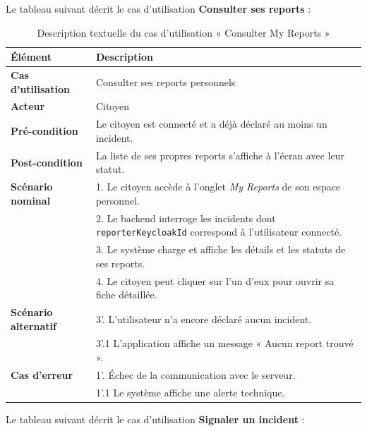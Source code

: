 Le tableau suivant décrit le cas d'utilisation \textbf{\og Consulter ses reports \fg{}} :

\begin{table}[H]
    \centering
    \caption{Description textuelle du cas d'utilisation « Consulter My Reports »}
    \label{tab:txt_favs}
    \vspace{0.2cm}
    \small
    \begin{tabularx}{\textwidth}{|l|X|}
        \hline
        \textbf{Élément} & \textbf{Description} \\ \hline
        \textbf{Cas d’utilisation} & Consulter ses reports personnels \\ \hline
        \textbf{Acteur} & Citoyen \\ \hline
        \textbf{Pré-condition} & Le citoyen est connecté et a déjà déclaré au moins un incident. \\ \hline
        \textbf{Post-condition} & La liste de ses propres reports s'affiche à l'écran avec leur statut. \\ \hline
        \textbf{Scénario nominal} &
        1. Le citoyen accède à l'onglet \textit{My Reports} de son espace personnel.\\
        & 2. Le backend interroge les incidents dont \texttt{reporterKeycloakId} correspond à l'utilisateur connecté.\\
        & 3. Le système charge et affiche les détails et les statuts de ses reports.\\
        & 4. Le citoyen peut cliquer sur l'un d'eux pour ouvrir sa fiche détaillée. \\ \hline
        \textbf{Scénario alternatif} &
        3'. L'utilisateur n'a encore déclaré aucun incident.\\
        & 3'.1 L'application affiche un message « Aucun report trouvé ». \\ \hline
        \textbf{Cas d’erreur} &
        1'. Échec de la communication avec le serveur.\\
        & 1'.1 Le système affiche une alerte technique. \\ \hline
    \end{tabularx}
\end{table}

Le tableau suivant décrit le cas d'utilisation \textbf{\og Signaler un incident \fg{}} :

